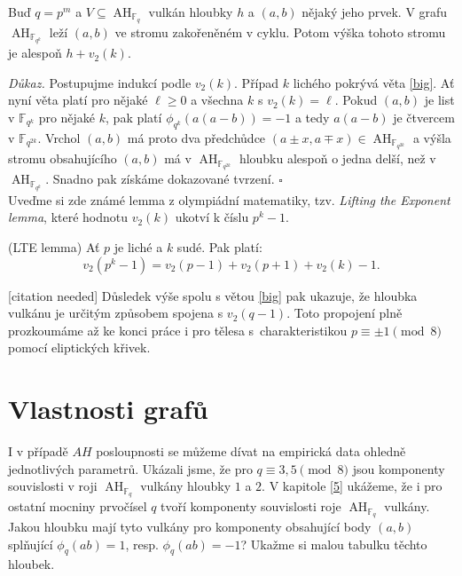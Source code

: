 \documentclass[12pt]{report}
\DeclareMathOperator{\AH}{AH}
\begin{document}
\begin{dusledek}\label{hloub}
Buď $q = p^m$ a $V \subseteq \AH_{\mathbb{F}_q}$ vulkán hloubky $h$ a $(a,b)$ nějaký jeho prvek. V grafu $\AH_{\mathbb{F}_{q^k}}$ leží $(a,b)$ ve stromu zakořeněném v cyklu. Potom výška tohoto stromu je alespoň $h+v_2(k)$.
\end{dusledek}
\noindent \textit{Důkaz.} Postupujme indukcí podle $v_2(k)$. Případ $k$ lichého pokrývá věta \ref{big}. Ať nyní věta platí pro nějaké $\ell \geqslant 0$ a všechna $k$ s $v_2 (k) = \ell$. Pokud $(a,b)$ je list v $\mathbb{F}_{q^k}$ pro nějaké $k$, pak platí $\phi_{q^k} (a(a-b)) = -1$ a tedy $a(a-b)$ je čtvercem v $\mathbb{F}_{q^{2k}}$. Vrchol $(a,b)$ má proto dva předchůdce $(a\pm x,a\mp x) \in \AH_{\mathbb{F}_{q^{2k}}}$  a výšla stromu obsahujícího $(a,b)$ má v $\AH_{\mathbb{F}_{q^{2k}}}$ hloubku alespoň o jedna delší, než v $\AH_{\mathbb{F}_{q^{k}}}$. Snadno pak získáme dokazované tvrzení. \hfill $\square$\\

Uveďme si zde známé lemma z olympiádní matematiky, tzv. \textit{Lifting the Exponent lemma}, které hodnotu $v_2(k)$ ukotví k číslu $p^k - 1$. 
\begin{veta}(LTE lemma)
Ať $p$ je liché a $k$ sudé. Pak platí:
$$v_2 (p^k - 1) = v_2(p-1)+v_2 (p+1) + v_2 (k) - 1.$$
\end{veta}
[citation needed] Důsledek výše spolu s větou \ref{big} pak ukazuje, že hloubka vulkánu je určitým způsobem spojena s $v_2 (q-1)$. Toto propojení plně prozkoumáme až ke konci práce i pro tělesa s~charakteristikou $p \equiv \pm 1 \pmod{8}$ pomocí eliptických křivek.

\section{Vlastnosti grafů}

I v případě $AH$ posloupnosti se můžeme dívat na empirická data ohledně jednotlivých parametrů. Ukázali jsme, že pro $q \equiv 3,5 \pmod{8}$ jsou komponenty souvislosti v roji $\AH_{\mathbb{F}_q}$ vulkány hloubky $1$ a $2$. V kapitole \ref{5} ukážeme, že i pro ostatní mocniny prvočísel $q$ tvoří komponenty souvislosti roje $\AH_{\mathbb{F}_q}$ vulkány. Jakou hloubku mají tyto vulkány pro komponenty obsahující body $(a,b)$ splňující $\phi_q(ab)=1$, resp. $\phi_q(ab)=-1$? Ukažme si malou tabulku těchto hloubek.
\end{document}
